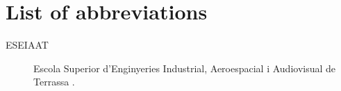 \chapter*{List of abbreviations}

\begin{description}
	\item[ESEIAAT] Escola Superior d’Enginyeries Industrial, Aeroespacial i Audiovisual de Terrassa \cite{eseiaat}.
\end{description}
